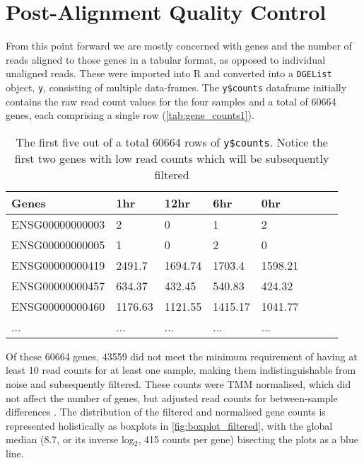 
\section{Post-Alignment Quality Control}
From this point forward we are mostly concerned with genes and the number of reads aligned to those genes in a tabular format, as opposed to individual unaligned reads. These were imported into R and converted into a \texttt{DGEList} object, \texttt{y}, consisting of multiple data-frames. The \texttt{y\$counts} dataframe initially contains the raw read count values for the four samples and a total of 60664 genes, each comprising a single row (\autoref{tab:gene_counts1}). 

\begin{table}[h]
\centering
\caption{The first five out of a total 60664 rows of \texttt{y\$counts}. Notice the first two genes with low read counts which will be subsequently filtered }
\label{tab:gene_counts1}
\begin{tabular}{llllllll}
\toprule
\textbf{Genes}           & \textbf{1hr}     & \textbf{12hr}    & \textbf{6hr}     & \textbf{0hr}      \\ \midrule
ENSG00000000003 & 2       & 0       & 1       & 2        \\
ENSG00000000005 & 1       & 0       & 2       & 0        \\
ENSG00000000419 & 2491.7  & 1694.74 & 1703.4  & 1598.21  \\
ENSG00000000457 & 634.37  & 432.45  & 540.83  & 424.32   \\
ENSG00000000460 & 1176.63 & 1121.55 & 1415.17 & 1041.77  \\
...             & ...     & ...     & ...     & ... \\  \bottomrule
\end{tabular}
\end{table}

Of these 60664 genes, 43559 did not meet the minimum requirement of having at least 10 read counts for at least one sample, making them indistinguishable from noise and subsequently filtered. These counts were \ac{TMM} normalised, which did not affect the number of genes, but adjusted read counts for between-sample differences \citep{robinson2010scaling}. The distribution of the filtered and normalised gene counts is represented holistically as boxplots in \autoref{fig:boxplot_filtered}, with the global median (8.7, or its inverse log$_2$, 415 counts per gene) bisecting the plots as a blue line.



